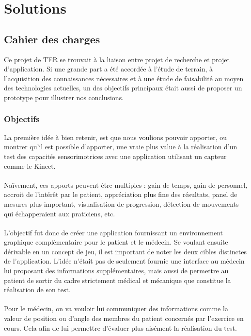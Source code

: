 \section{Solutions}
    

    
\subsection{Cahier des charges}
Ce projet de TER se trouvait à la liaison entre projet de recherche et projet d'application. Si une grande part a été accordée à 
l'étude de terrain, à l'acquisition des connaissances nécessaires et à une étude de faisabilité au moyen des technologies actuelles, un des objectifs principaux était aussi de proposer un prototype pour illustrer nos conclusions.
    
\subsubsection{Objectifs}
La première idée à bien retenir, est que nous voulions pouvoir apporter, ou montrer qu'il est possible d'apporter, une vraie plus 
value à la réalisation d'un test des capacités sensorimotrices avec une application utilisant un capteur comme le Kinect.
\paragraph{}
Naïvement, ces apports peuvent être multiples : gain de temps, gain de personnel, accroit de l'intérêt par le patient, appréciation
plus fine des résultats, panel de mesures plus important, visualisation de progression, détection de mouvements qui
échapperaient aux praticiens, etc.

\paragraph{}
L'objectif fut donc de créer une application fournissant un environnement graphique complémentaire pour le patient et le médecin.
Se voulant ensuite dérivable en un concept de jeu, il est important de noter les deux cibles distinctes de l'application. L'idée 
n'était pas de seulement fournie une interface au médecin lui proposant des informations supplémentaires, mais aussi de
permettre au patient de sortir du cadre strictement médical et mécanique que constitue la réalisation de son test.

\paragraph{}
Pour le médecin, on va vouloir lui communiquer des informations comme la valeur de position ou d'angle des membres du
patient concernés par l'exercice en cours. Cela afin de lui permettre d'évaluer plus aisément la réalisation du test. 

